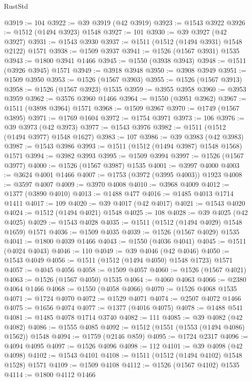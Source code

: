 \begin{lexlean}{RustStd}
\begin{coremodule}
{{@3919 := 104
@3922 := @39 @3919 (@42 @3919)
@3923 := @1543 @3922
@3926 := @1512 (@1494 @3923) @1548
@3927 := 101
@3930 := @39 @3927 (@42 @3927)
@3931 := @1543 @3930
@3937 := @1511 (@1512 (@1494 @3931) @1548 @2122) @1571
@3938 := @1509 @3937
@3941 := @1526 (@1567 @3931) @1535
@3943 := @1800 @3941 @1466
@3945 := @1550 (@3938 @3943)
@3948 := @1511 (@3926 @3945) @1571
@3949 := @3918 @3948
@3950 := @3908 @3949
@3951 := @1509 @3950
@3953 := @1526 (@1567 @3903)
@3955 := @1526 (@1567 @3913)
@3958 := @1526 (@1567 @3923) @1535
@3959 := @3955 @3958
@3960 := @3953 @3959
@3962 := @3576 @3960 @1466
@3964 := @1550 (@3951 @3962)
@3967 := @1511 (@3898 @3964) @1571
@3968 := @1509 @3967
@3970 := @1749 (@1567 @3895)
@3971 := @1769 @1604
@3972 := @1754 @3971
@3973 := 106
@3976 := @39 @3973 (@42 @3973)
@3977 := @1543 @3976
@3982 := @1511 (@1512 (@1494 @3977) @1548 @1627)
@3983 := 107
@3986 := @39 @3983 (@42 @3983)
@3987 := @1543 @3986
@3993 := @1511 (@1512 (@1494 @3987) @1548 @1568) @1571
@3994 := @3982 @3993
@3995 := @1509 @3994
@3997 := @1526 (@1567 @3977)
@4000 := @1526 (@1567 @3987) @1535
@4001 := @3997 @4000
@4003 := @3624 @4001 @1466
@4007 := @1753 (@3972 (@3995 @4003)) @1923
@4008 := @3597 @4007
@4009 := @3970 @4008
@4010 := @3968 @4009
@4012 := @1377 (@3890 @4010)
@4013 := @1488 @477
@4016 := @1485 @4013 @1714 @1411
@4017 := 109
@4020 := @39 @4017 (@42 @4017)
@4021 := @1543 @4020
@4024 := @1512 (@1494 @4021) @1548
@4025 := 108
@4028 := @39 @4025 (@42 @4025)
@4029 := @1543 @4028
@4035 := @1511 (@1512 (@1494 @4029) @1548 @1659) @1571
@4036 := @1509 @4035
@4039 := @1526 (@1567 @4029) @1535
@4041 := @1800 @4039 @1466
@4043 := @1550 (@4036 @4041)
@4045 := @1511 (@4024 @4043)
@4046 := 110
@4049 := @39 @4046 (@42 @4046)
@4050 := @1543 @4049
@4056 := @1511 (@1512 (@1494 @4050) @1548 @1723) @1571
@4057 := @4045 @4056
@4058 := @1509 @4057
@4060 := @1526 (@1567 @4021)
@4063 := @1526 (@1567 @4050) @1535
@4064 := @4060 @4063
@4066 := @2380 @4064 @1466
@4068 := @1550 (@4058 @4066)
@4070 := @1526 @4068 @1535
@4071 := @1724 @4070
@4072 := @1529 @4071
@4074 := @2507 @4072 @1466
@4075 := @1656 @4074
@4077 := @1377 (@4016 @4075)
@4078 := @1488 @541
@4081 := @1485 @4078 @1714 @3740
@4082 := 111
@4085 := @39 @4082 (@42 @4082)
@4086 := @1555 @4085
@4092 := @1512 (@1551 (@1553 (@1494 @4086) @1562)) @1548
@4094 := @1759 (@2146 @859)
@4095 := @1724 @2317
@4096 := @4094 @4095
@4097 := @1526 @4096
@4098 := 112
@4101 := @39 @4098 (@42 @4098)
@4102 := @1543 @4101
@4108 := @1511 (@1512 (@1494 @4102) @1548 @1528) @1571
@4109 := @1509 @4108
@4112 := @1526 (@1567 @4102) @1535
@4114 := @1800 @4112 @1466
}}
\end{coremodule}
\end{lexlean}
